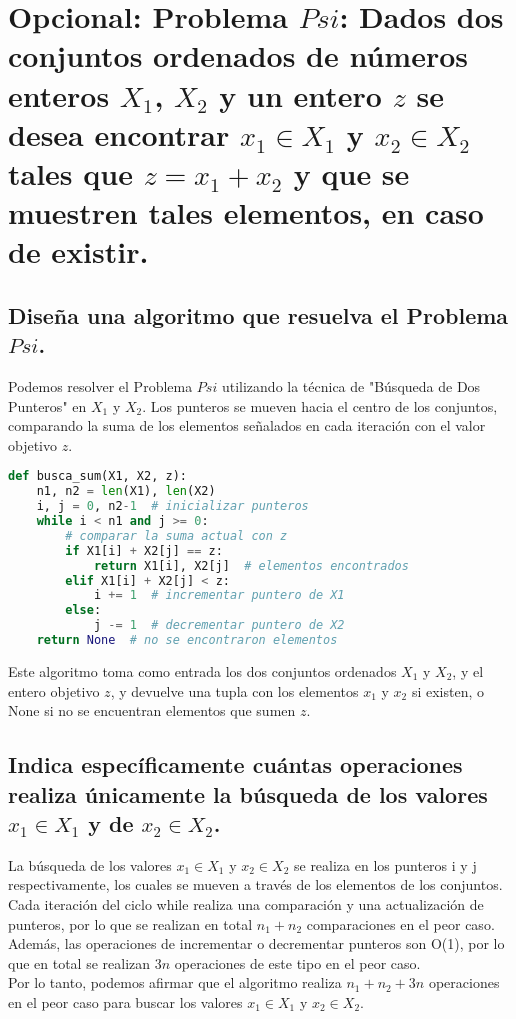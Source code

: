 \section{Opcional: Problema $Psi$: Dados dos conjuntos ordenados de números enteros $X_1$, $X_2$ y un entero $z$ se desea encontrar $x_1\in X_1$ y $x_2 \in X_2$ tales que $z=x_1+x_2$ y que se muestren tales elementos, en caso de existir.}


\subsection{Diseña una algoritmo que resuelva el Problema $Psi$.}

Podemos resolver el Problema $Psi$ utilizando la técnica de "Búsqueda de Dos Punteros" en $X_1$ y $X_2$. Los punteros se mueven hacia el centro de los conjuntos, comparando la suma de los elementos señalados en cada iteración con el valor objetivo $z$.\\

\begin{lstlisting}[language=python]
def busca_sum(X1, X2, z):
    n1, n2 = len(X1), len(X2)
    i, j = 0, n2-1  # inicializar punteros
    while i < n1 and j >= 0:
        # comparar la suma actual con z
        if X1[i] + X2[j] == z:
            return X1[i], X2[j]  # elementos encontrados
        elif X1[i] + X2[j] < z:
            i += 1  # incrementar puntero de X1
        else:
            j -= 1  # decrementar puntero de X2
    return None  # no se encontraron elementos

\end{lstlisting}

Este algoritmo toma como entrada los dos conjuntos ordenados $X_1$ y $X_2$, y el entero objetivo $z$, y devuelve una tupla con los elementos $x_1$ y $x_2$ si existen, o None si no se encuentran elementos que sumen $z$.

\subsection{Indica específicamente cuántas operaciones realiza únicamente la búsqueda de los valores $x_1 \in X_1$ y de $x_2 \in X_2$.}

La búsqueda de los valores $x_1 \in X_1$ y $x_2 \in X_2$ se realiza en los punteros i y j respectivamente, los cuales se mueven a través de los elementos de los conjuntos.\\

Cada iteración del ciclo while realiza una comparación y una actualización de punteros, por lo que se realizan en total $n_1 + n_2$ comparaciones en el peor caso. Además, las operaciones de incrementar o decrementar punteros son O(1), por lo que en total se realizan $3n$ operaciones de este tipo en el peor caso.\\

Por lo tanto, podemos afirmar que el algoritmo realiza $n_1 + n_2 + 3n$ operaciones en el peor caso para buscar los valores $x_1 \in X_1$ y $x_2 \in X_2$.
